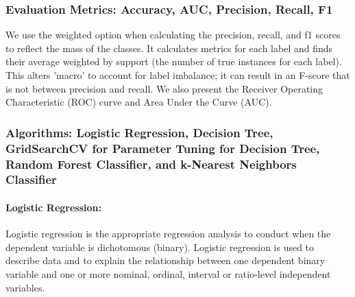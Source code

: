\documentclass[11pt]{article}
\begin{document}
\subsubsection{Evaluation Metrics: Accuracy, AUC, Precision, Recall, F1}

We use the weighted option when calculating the precision, recall, and f1 scores to reflect the mass of the classes.
It calculates metrics for each label and finds their average weighted by support (the number of true instances for each label). This alters 'macro' to account for label imbalance; it can result in an F-score that is not between precision and recall.
%
We also present the Receiver Operating Characteristic (ROC) curve and Area Under the Curve (AUC). 


\subsubsection{Algorithms: Logistic Regression, Decision Tree, GridSearchCV for Parameter Tuning for Decision Tree, Random Forest Classifier, and k-Nearest Neighbors Classifier}
\label{Classification_algorithms}

\paragraph*{Logistic Regression:}
Logistic regression is the appropriate regression analysis to conduct when the dependent variable is dichotomous (binary). Logistic regression is used to describe data and to explain the relationship between one dependent binary variable and one or more nominal, ordinal, interval or ratio-level independent variables.
\end{document}
